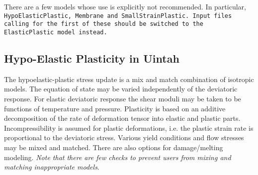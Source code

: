 There are a few models whose use is explicitly not recommended.  In particular,
\tt HypoElasticPlastic, Membrane and SmallStrainPlastic. \normalfont  Input
files calling for the first of these should be switched to the
\tt ElasticPlastic \normalfont model instead.

\subsection{Hypo-Elastic Plasticity in Uintah}  \label{Sec:ElasticPlastic}

The hypoelastic-plastic stress update is a mix and match combination
of isotropic models.  The equation of state may be varied
independently of the deviatoric response.  For elastic deviatoric
response the shear moduli may be taken to be functions of temperature
and pressure.  Plasticity is based on an additive decomposition of the
rate of deformation tensor into elastic and plastic parts.
Incompressibility is assumed for plastic deformations, i.e. the
plastic strain rate is proportional to the deviatoric stress.  Various
yield conditions and flow stresses may be mixed and matched.  There
are also options for damage/melting modeling.  {\it Note that there
  are few checks to prevent users from mixing and matching
  inappropriate models}.

